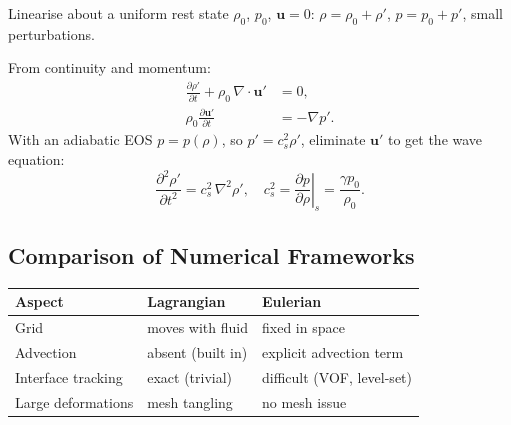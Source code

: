 Linearise about a uniform rest state $\rho_0$, $p_0$, $\mathbf{u}=0$:
$\rho = \rho_0+\rho'$, $p=p_0+p'$, small perturbations.

From continuity and momentum:
\begin{align}
  \frac{\partial \rho'}{\partial t} + \rho_0\,\nabla\cdot\mathbf{u}' &= 0, \\
  \rho_0\frac{\partial\mathbf{u}'}{\partial t} &= -\nabla p'.
\end{align}
With an adiabatic EOS $p=p(\rho)$, so $p' = c_s^2\rho'$, eliminate
$\mathbf{u}'$ to get the wave equation:
\begin{equation}
  \frac{\partial^2 \rho'}{\partial t^2} = c_s^2\,\nabla^2\rho',
  \quad
  c_s^2 = \left.\frac{\partial p}{\partial \rho}\right|_s
         = \frac{\gamma p_0}{\rho_0}.
  \label{eq:lec18:sound}
\end{equation}


\subsection{Comparison of Numerical Frameworks}\label{subsec:lec18:numerics}

\begin{center}
\begin{tabular}{lll}
\toprule
Aspect & Lagrangian & Eulerian \\
\midrule
Grid & moves with fluid & fixed in space \\
Advection & absent (built in) & explicit advection term \\
Interface tracking & exact (trivial) & difficult (VOF, level-set) \\
Large deformations & mesh tangling & no mesh issue \\
\bottomrule
\end{tabular}
\end{center}

